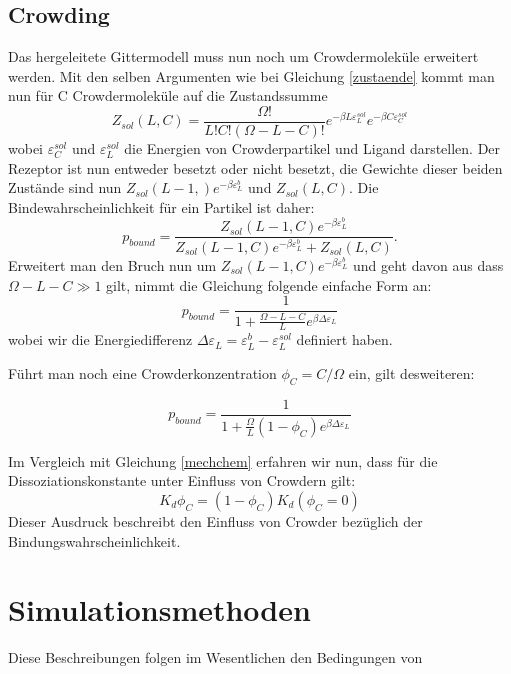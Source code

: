 \documentclass[bachelor,       %
               twoside,        %
               BCOR10mm,       %
               english,ngerman, %
               ]{GAUBM}
\begin{document}
\subsection{Crowding}
Das hergeleitete Gittermodell muss nun noch um Crowdermoleküle erweitert werden.
Mit den selben Argumenten wie bei Gleichung \ref{zustaende} kommt man nun für C Crowdermoleküle auf die Zustandssumme
\begin{equation}
Z_{sol}(L,C) = \frac{\Omega!}{L!C!(\Omega-L-C)!}e^{-\beta L\varepsilon_L^{sol}}e^{-\beta C\varepsilon_C^{sol}}
\end{equation}
wobei $\varepsilon_C^{sol}$ und $\varepsilon_L^{sol}$ die Energien von Crowderpartikel und Ligand darstellen.
Der Rezeptor ist nun entweder besetzt oder nicht besetzt, die Gewichte dieser beiden Zustände sind nun
$Z_{sol}(L-1,)e^{-\beta\varepsilon_L^b}$ und $Z_{sol}(L,C)$. Die Bindewahrscheinlichkeit für ein Partikel ist daher:
\begin{equation}
p_{bound} = \frac{Z_{sol}(L-1,C)e^{-\beta\varepsilon_L^b}}{Z_{sol}(L-1,C)e^{-\beta\varepsilon_L^b}+Z_{sol}(L,C)}.
\end{equation}
Erweitert man den Bruch nun um $Z_{sol}(L-1,C)e^{-\beta\varepsilon_L^b}$ und geht davon aus dass
$\Omega-L-C \gg 1$ gilt, nimmt die Gleichung folgende einfache Form an:
\begin{equation}
p_{bound} = \frac{1}{1+\frac{\Omega-L-C}{L}e^{\beta\Delta\varepsilon_L}}
\end{equation}
wobei wir die Energiedifferenz $\Delta\varepsilon_L = \varepsilon_L^b - \varepsilon_L^{sol}$ definiert haben.

Führt man noch eine Crowderkonzentration $\phi_C = C/\Omega$ ein, gilt desweiteren:

\begin{equation}
p_{bound} = \frac{1}{1+\frac{\Omega}{L}(1-\phi_C)e^{\beta\Delta\varepsilon_L}}
\end{equation}

Im Vergleich mit Gleichung \ref{mechchem} erfahren wir nun, dass für die Dissoziationskonstante unter
Einfluss von Crowdern gilt:
\begin{equation}
K_d{\phi_C} = (1-\phi_C) K_d(\phi_C = 0)
\end{equation}
Dieser Ausdruck beschreibt den Einfluss von Crowder bezüglich der Bindungswahrscheinlichkeit.



\section{Simulationsmethoden}
Diese Beschreibungen folgen im Wesentlichen den Bedingungen von \cite{frontphy}
\end{document}
